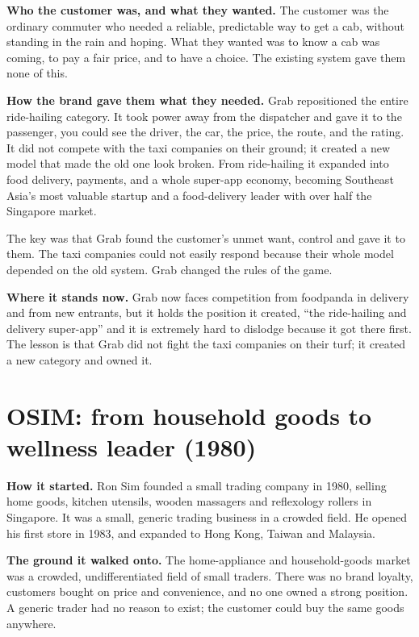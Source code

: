 \documentclass[10pt,twoside,openany]{memoir}
\newcommand{\needspacehead}{\needspace{4\baselineskip}}
\let\oldsection\section
\renewcommand{\section}{\needspacehead\oldsection}
\begin{document}
\textbf{Who the customer was, and what they wanted.} The customer was
the ordinary commuter who needed a reliable, predictable way to get a
cab, without standing in the rain and hoping. What they wanted was to
know a cab was coming, to pay a fair price, and to have a choice. The
existing system gave them none of this.

\textbf{How the brand gave them what they needed.} Grab repositioned the
entire ride-hailing category. It took power away from the dispatcher and
gave it to the passenger, you could see the driver, the car, the price,
the route, and the rating. It did not compete with the taxi companies on
their ground; it created a new model that made the old one look broken.
From ride-hailing it expanded into food delivery, payments, and a whole
super-app economy, becoming Southeast Asia's most valuable startup and a
food-delivery leader with over half the Singapore market.

The key was that Grab found the customer's unmet want, control and gave
it to them. The taxi companies could not easily respond because their
whole model depended on the old system. Grab changed the rules of the
game.

\textbf{Where it stands now.} Grab now faces competition from foodpanda
in delivery and from new entrants, but it holds the position it created,
``the ride-hailing and delivery super-app'' and it is extremely hard to
dislodge because it got there first. The lesson is that Grab did not
fight the taxi companies on their turf; it created a new category and
owned it.

\section{OSIM: from household goods to wellness leader
(1980)}\label{osim-from-household-goods-to-wellness-leader-1980}

\textbf{How it started.} Ron Sim founded a small trading company in
1980, selling home goods, kitchen utensils, wooden massagers and
reflexology rollers in Singapore. It was a small, generic trading
business in a crowded field. He opened his first store in 1983, and
expanded to Hong Kong, Taiwan and Malaysia.

\textbf{The ground it walked onto.} The home-appliance and
household-goods market was a crowded, undifferentiated field of small
traders. There was no brand loyalty, customers bought on price and
convenience, and no one owned a strong position. A generic trader had no
reason to exist; the customer could buy the same goods anywhere.
\end{document}
